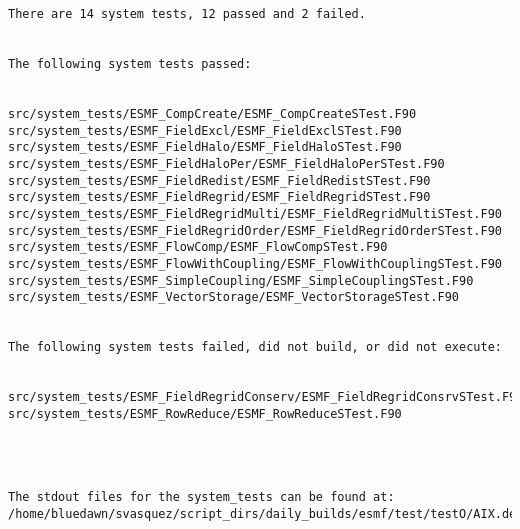 \begin{verbatim}
There are 14 system tests, 12 passed and 2 failed.


The following system tests passed:


src/system_tests/ESMF_CompCreate/ESMF_CompCreateSTest.F90
src/system_tests/ESMF_FieldExcl/ESMF_FieldExclSTest.F90
src/system_tests/ESMF_FieldHalo/ESMF_FieldHaloSTest.F90
src/system_tests/ESMF_FieldHaloPer/ESMF_FieldHaloPerSTest.F90
src/system_tests/ESMF_FieldRedist/ESMF_FieldRedistSTest.F90
src/system_tests/ESMF_FieldRegrid/ESMF_FieldRegridSTest.F90
src/system_tests/ESMF_FieldRegridMulti/ESMF_FieldRegridMultiSTest.F90
src/system_tests/ESMF_FieldRegridOrder/ESMF_FieldRegridOrderSTest.F90
src/system_tests/ESMF_FlowComp/ESMF_FlowCompSTest.F90
src/system_tests/ESMF_FlowWithCoupling/ESMF_FlowWithCouplingSTest.F90
src/system_tests/ESMF_SimpleCoupling/ESMF_SimpleCouplingSTest.F90
src/system_tests/ESMF_VectorStorage/ESMF_VectorStorageSTest.F90


The following system tests failed, did not build, or did not execute:


src/system_tests/ESMF_FieldRegridConserv/ESMF_FieldRegridConsrvSTest.F90
src/system_tests/ESMF_RowReduce/ESMF_RowReduceSTest.F90




The stdout files for the system_tests can be found at:
/home/bluedawn/svasquez/script_dirs/daily_builds/esmf/test/testO/AIX.default.64.default

\end{verbatim}

